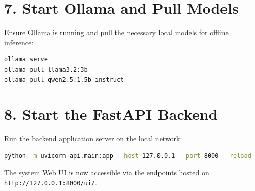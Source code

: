 \documentclass[../main.tex]{subfiles}
\begin{document}
\section*{7. Start Ollama and Pull Models}
Ensure Ollama is running and pull the necessary local models for offline inference:
\begin{lstlisting}[language=bash, breaklines=true]
ollama serve
ollama pull llama3.2:3b
ollama pull qwen2.5:1.5b-instruct
\end{lstlisting}

\section*{8. Start the FastAPI Backend}
Run the backend application server on the local network:
\begin{lstlisting}[language=bash, breaklines=true]
python -m uvicorn api.main:app --host 127.0.0.1 --port 8000 --reload
\end{lstlisting}
The system Web UI is now accessible via the endpoints hosted on \texttt{http://127.0.0.1:8000/ui/}.
\end{document}
